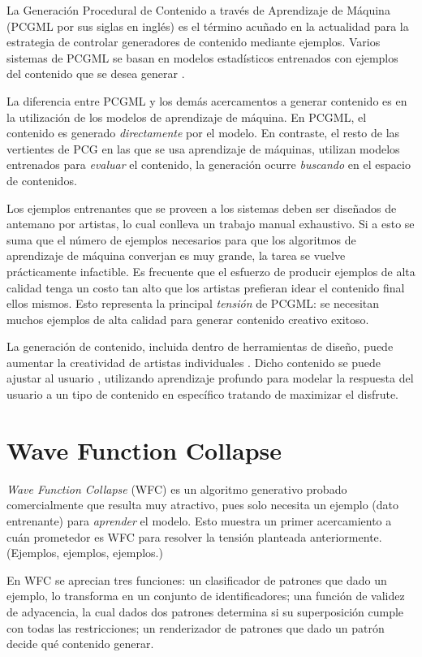 La Generación Procedural de Contenido a través de Aprendizaje de Máquina (PCGML por sus siglas en inglés)
es el término acuñado en la actualidad para la estrategia de controlar
generadores de contenido mediante ejemplos. Varios sistemas
de PCGML se basan en modelos estadísticos entrenados con ejemplos
del contenido que se desea generar \cite{bib:1}. 

La diferencia entre PCGML y los demás acercamentos a 
generar contenido es en la utilización de los modelos
de aprendizaje de máquina.
En PCGML, el contenido es generado \textit{directamente} por el modelo.
En contraste, el resto de las vertientes de PCG en las que se usa
aprendizaje de máquinas, utilizan modelos
entrenados para \textit{evaluar} el contenido, la generación
ocurre \textit{buscando} en el espacio de contenidos.

Los ejemplos entrenantes que se proveen
a los sistemas deben ser diseñados de antemano por artistas, lo cual
conlleva un trabajo manual exhaustivo. Si a esto se suma que el número
de ejemplos necesarios para que los algoritmos de aprendizaje de máquina
converjan es muy grande, la tarea se vuelve prácticamente infactible.
Es frecuente que el esfuerzo de producir ejemplos de alta calidad
tenga un costo tan alto que los artistas prefieran idear
el contenido final ellos mismos. Esto representa la principal
\textit{tensión} de PCGML: se necesitan muchos ejemplos de alta calidad
para generar contenido creativo exitoso.

La generación de contenido, incluida dentro de herramientas de diseño,
puede aumentar la creatividad de artistas individuales \cite{bib:4}.
Dicho contenido se puede ajustar al usuario
\cite{bib:7}, utilizando aprendizaje profundo para modelar la respuesta
del usuario a un tipo de contenido en específico tratando de maximizar
el disfrute.

\section*{Wave Function Collapse}

\textit{Wave Function Collapse} (WFC) \cite{bib:2} es un algoritmo generativo probado
comercialmente que resulta muy atractivo, pues
solo necesita un ejemplo (dato entrenante) para \textit{aprender} el modelo.
Esto muestra un primer acercamiento a cuán
prometedor es WFC para resolver la tensión planteada anteriormente.
(Ejemplos, ejemplos, ejemplos.)

En WFC se aprecian tres funciones: un clasificador de patrones 
que dado un ejemplo, lo transforma en un conjunto de identificadores;
una función de validez de adyacencia, la cual dados dos patrones determina
si su superposición cumple con todas las restricciones; un 
renderizador de patrones que dado un patrón decide qué contenido generar.


